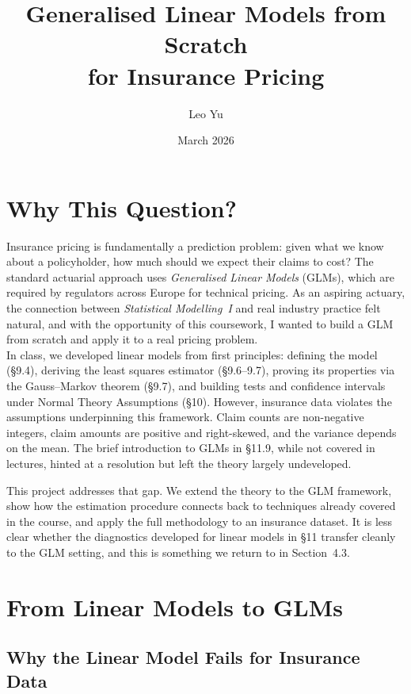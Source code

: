 \documentclass[11pt]{article}
\title{Generalised Linear Models from Scratch\\for Insurance Pricing}
\author{Leo Yu}
\date{March 2026}
\begin{document}
\maketitle
\thispagestyle{fancy}

\section{Why This Question?}

Insurance pricing is fundamentally a prediction problem: given what we know about a
policyholder, how much should we expect their claims to cost? The standard actuarial
approach uses \textit{Generalised Linear Models} (GLMs), which are required by regulators
across Europe for technical pricing. As an aspiring actuary, the connection between
\textit{Statistical Modelling~I} and real industry practice felt natural, and with the
opportunity of this coursework, I wanted to build a GLM from scratch and apply it to
a real pricing problem.\\

\noindent In class, we developed linear models from first principles: defining the model
(\S9.4), deriving the least squares estimator (\S9.6--9.7), proving its properties via
the Gauss--Markov theorem (\S9.7), and building tests and confidence intervals under
Normal Theory Assumptions (\S10). However, insurance data violates the assumptions
underpinning this framework. Claim counts are non-negative integers, claim amounts are
positive and right-skewed, and the variance depends on the mean. The brief introduction
to GLMs in \S11.9, while not covered in lectures, hinted at a resolution
but left the theory largely undeveloped.


\noindent This project addresses that gap. We extend the theory to the GLM framework,
show how the estimation procedure connects back to techniques already covered in the course,
and apply the full methodology to an insurance dataset. It is less clear whether
the diagnostics developed for linear models in \S11 transfer cleanly to the GLM
setting, and this is something we return to in Section~4.3.

\section{From Linear Models to GLMs}

\subsection{Why the Linear Model Fails for Insurance Data}
\end{document}

